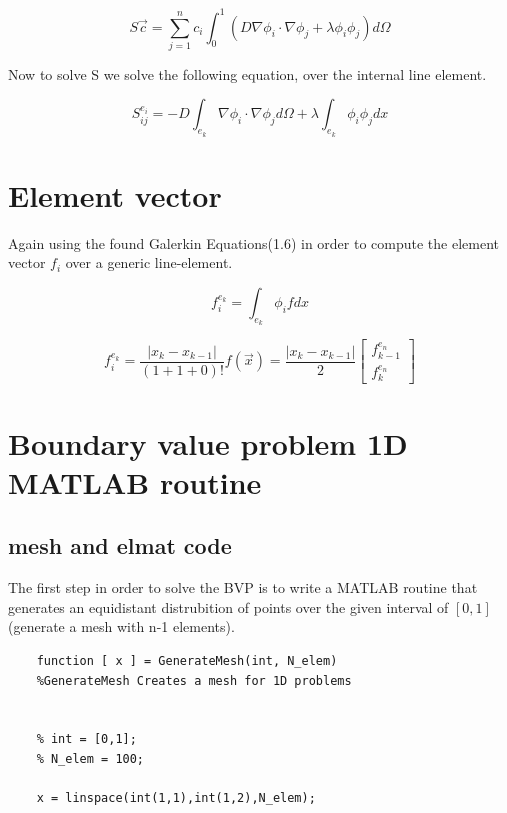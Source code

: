 \documentclass[a4paper]{report}
\begin{document}
\begin{equation}
S\vec{c}=	\sum_{j=1}^{n}c_i\int_{0}^{1} (D\nabla\phi_i\cdot\nabla\phi_j +\lambda\phi_i\phi_j )d\Omega
\end{equation}
\medskip

Now to solve S we solve the following equation, over the internal line element.

\begin{equation}
S^{e_i}_{ij} = -D\int_{e_k}\nabla\phi_i\cdot\nabla\phi_j d\Omega+\lambda\int_{e_k}\phi_i\phi_j dx
\end{equation}


\section{Element vector}
Again using the found Galerkin Equations(1.6) in order to compute the element vector $f_i$ over a generic line-element.

\begin{equation}
f^{e_k}_i = \int_{e_k}\phi_i f dx
\end{equation}

\begin{equation}
	f^{e_k}_i =\frac{\lvert x_k-x_{k-1}\lvert}{(1+1+0)!}f(\vec{x}) =\frac{\lvert x_k-x_{k-1}\lvert}{2}
	\begin{bmatrix} f^{e_n}_{k-1}\\ f^{e_n}_{k}
	\end{bmatrix}
\end{equation}







\section{Boundary value problem 1D MATLAB routine}

\subsection{mesh and elmat code}
The first step in order to solve the BVP is to write a MATLAB routine that generates an equidistant distrubition of points over the given interval of $[0,1]$(generate a mesh with n-1 elements).

\begin{lstlisting}
	function [ x ] = GenerateMesh(int, N_elem)
	%GenerateMesh Creates a mesh for 1D problems
	
	
	% int = [0,1];
	% N_elem = 100;
	
	x = linspace(int(1,1),int(1,2),N_elem);
	
\end{lstlisting}
	
\end{document}
